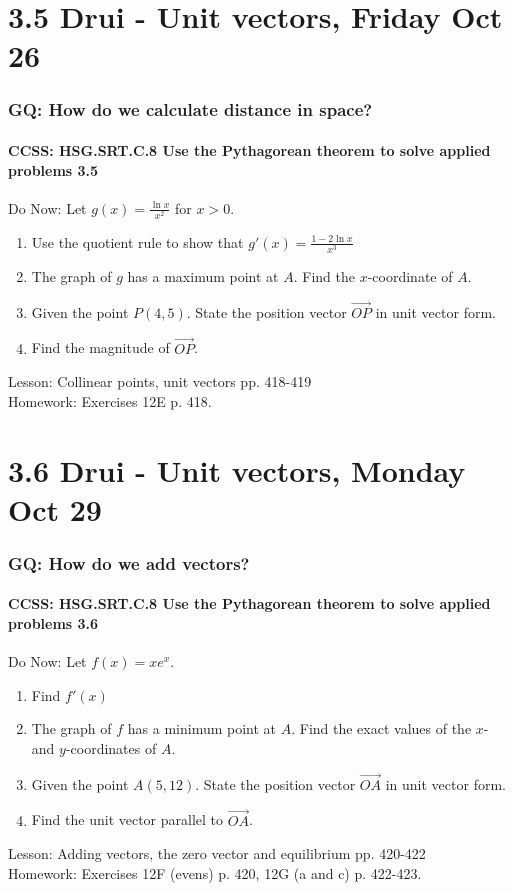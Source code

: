 \documentclass{beamer}
\begin{document}
\section{3.5 Drui - Unit vectors, Friday Oct 26}
  \frame
  {
    \frametitle{GQ: How do we calculate distance in space?}
    \framesubtitle{CCSS: HSG.SRT.C.8 Use the Pythagorean theorem to solve applied problems \qquad \alert{3.5}}

    \begin{block}{Do Now: Let $\displaystyle g(x)=\frac{\ln x}{x^2}$ for $x>0$.}
    \begin{enumerate}
        \item Use the quotient rule to show that $\displaystyle g'(x)=\frac{1-2\ln x}{x^3}$
        \item The graph of $g$ has a maximum point at $A$. Find the $x$-coordinate of $A$.
        \item Given the point $P(4,5)$. State the position vector $\overrightarrow{OP}$ in unit vector form.
        \item Find the magnitude of $\overrightarrow{OP}$.
    \end{enumerate}
    \end{block}
    Lesson: Collinear points, unit vectors pp. 418-419\\ \bigskip
    Homework: Exercises 12E p. 418.
  }

\section{3.6 Drui - Unit vectors, Monday Oct 29}
  \frame
  {
    \frametitle{GQ: How do we add vectors?}
    \framesubtitle{CCSS: HSG.SRT.C.8 Use the Pythagorean theorem to solve applied problems \qquad \alert{3.6}}

    \begin{block}{Do Now: Let $f(x)=x e^x$.}
    \begin{enumerate}
        \item Find $f'(x)$
        \item The graph of $f$ has a minimum point at $A$. Find the exact values of the $x$- and $y$-coordinates of $A$.
        \item Given the point $A(5,12)$. State the position vector $\overrightarrow{OA}$ in unit vector form.
        \item Find the unit vector parallel to $\overrightarrow{OA}$.
    \end{enumerate}
    \end{block}
    Lesson: Adding vectors, the zero vector and equilibrium pp. 420-422\\ \bigskip
    Homework: Exercises 12F (evens) p. 420, 12G (a and c) p. 422-423.
  }
\end{document}
